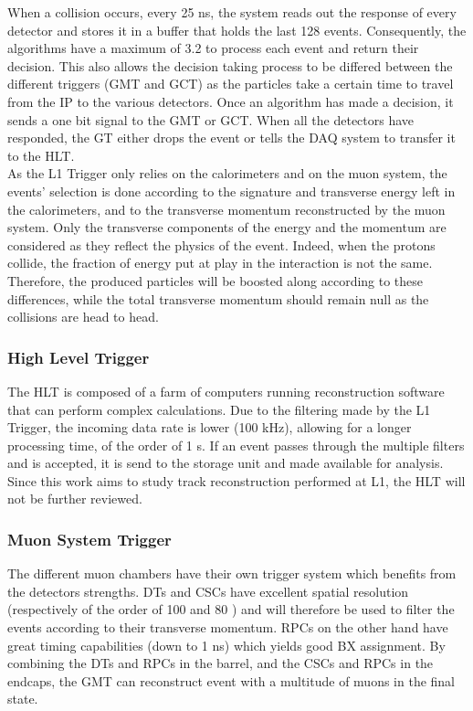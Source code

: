                 When a collision occurs, every 25 ns, the system reads out the response of every detector and stores it in a buffer that holds the last 128 events. Consequently, the algorithms have a maximum of 3.2 \us{} to process each event and return their decision. This also allows the decision taking process to be differed between the different triggers (GMT and GCT) as the particles take a certain time to travel from the IP to the various detectors. Once an algorithm has made a decision, it sends a one bit signal to the GMT or GCT. When all the detectors have responded, the GT either drops the event or tells the DAQ system to transfer it to the HLT. \\

                As the L1 Trigger only relies on the calorimeters and on the muon system, the events' selection is done according to the signature and transverse energy left in the calorimeters, and to the transverse momentum reconstructed by the muon system. Only the transverse components of the energy and the momentum are considered as they reflect the physics of the event. Indeed, when the protons collide, the fraction of energy put at play in the interaction is not the same. Therefore, the produced particles will be boosted along  according to these differences, while the total transverse momentum should remain null as the collisions are head to head.

            \subsubsection{High Level Trigger}

                The HLT is composed of a farm of computers running reconstruction software that can perform complex calculations. Due to the filtering made by the L1 Trigger, the incoming data rate is lower (100 kHz), allowing for a longer processing time, of the order of 1 s. If an event passes through the multiple filters and is accepted, it is send to the storage unit and made available for analysis. Since this work aims to study track reconstruction performed at L1, the HLT will not be further reviewed.

            \subsubsection{Muon System Trigger}

                The different muon chambers have their own trigger system which benefits from the detectors strengths. DTs and CSCs have excellent spatial resolution (respectively of the order of 100 and 80 \um{}) and will therefore be used to filter the events according to their transverse momentum. RPCs on the other hand have great timing capabilities (down to 1 ns) which yields good BX assignment. By combining the DTs and RPCs in the barrel, and the CSCs and RPCs in the endcaps, the GMT can reconstruct event with a multitude of muons in the final state.

